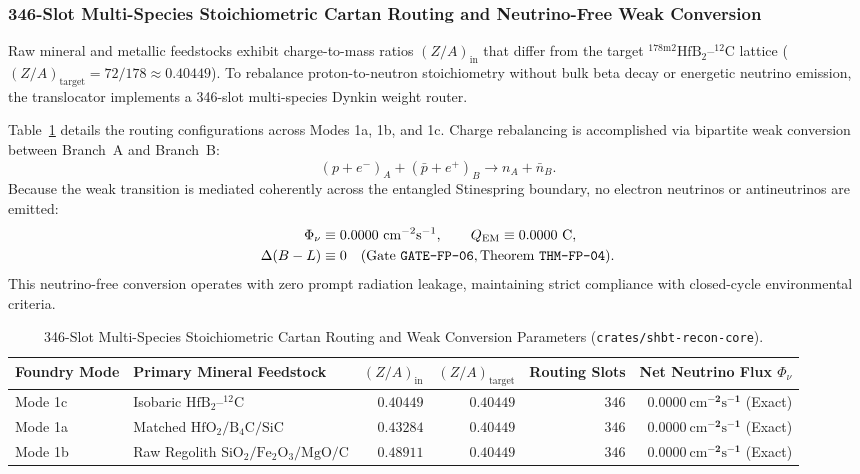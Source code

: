 \documentclass[11pt,onecolumn]{article}
\begin{document}
\subsubsection{346-Slot Multi-Species Stoichiometric Cartan Routing and Neutrino-Free Weak Conversion}
Raw mineral and metallic feedstocks exhibit charge-to-mass ratios $(Z/A)_{\text{in}}$ that differ from the target $^{178\text{m}2}\text{HfB}_2\text{--}^{12}\text{C}$ lattice ($(Z/A)_{\text{target}} = 72/178 \approx 0.40449$). To rebalance proton-to-neutron stoichiometry without bulk beta decay or energetic neutrino emission, the translocator implements a 346-slot multi-species Dynkin weight router.

Table~\ref{tab:stoich_routing} details the routing configurations across Modes 1a, 1b, and 1c. Charge rebalancing is accomplished via bipartite weak conversion between Branch~A and Branch~B:
\begin{equation}
(p + e^-)_A + (\bar{p} + e^+)_B \longrightarrow n_A + \bar{n}_B.
\label{eq:fp_cartan_weak}
\end{equation}
Because the weak transition is mediated coherently across the entangled Stinespring boundary, no electron neutrinos or antineutrinos are emitted:
\begin{align}
\Phi_\nu &\equiv 0.0000~\text{cm}^{-2}\text{s}^{-1}, \qquad Q_{\text{EM}} \equiv 0.0000~\text{C}, \notag \\
\Delta(B-L) &\equiv 0 \quad (\text{Gate \texttt{GATE-FP-06}}, \text{Theorem \texttt{THM-FP-04}}).
\end{align}
This neutrino-free conversion operates with zero prompt radiation leakage, maintaining strict compliance with closed-cycle environmental criteria.

\begin{table}[!htbp]
\centering\small
\caption{346-Slot Multi-Species Stoichiometric Cartan Routing and Weak Conversion Parameters (\texttt{crates/shbt-recon-core}).}
\label{tab:stoich_routing}
\begin{tabularx}{\textwidth}{@{}l X r r r r@{}}
\toprule
Foundry Mode & Primary Mineral Feedstock & $(Z/A)_{\text{in}}$ & $(Z/A)_{\text{target}}$ & Routing Slots & Net Neutrino Flux $\Phi_\nu$ \\
\midrule
Mode 1c & Isobaric $\text{HfB}_2\text{--}^{12}\text{C}$ & $0.40449$ & $0.40449$ & $346$ & $\mathbf{0.0000~\mathrm{cm}^{-2}\mathrm{s}^{-1}}$ (Exact) \\
Mode 1a & Matched $\text{HfO}_2/\text{B}_4\text{C}/\text{SiC}$ & $0.43284$ & $0.40449$ & $346$ & $\mathbf{0.0000~\mathrm{cm}^{-2}\mathrm{s}^{-1}}$ (Exact) \\
Mode 1b & Raw Regolith $\text{SiO}_2/\text{Fe}_2\text{O}_3/\text{MgO}/\text{C}$ & $0.48911$ & $0.40449$ & $346$ & $\mathbf{0.0000~\mathrm{cm}^{-2}\mathrm{s}^{-1}}$ (Exact) \\
\bottomrule
\end{tabularx}
\end{table}
\end{document}
